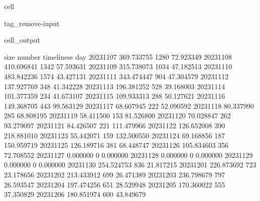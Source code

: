 \documentclass[letterpaper,10pt,english]{jupyterBook}
\begin{document}
\begin{sphinxuseclass}{cell}
\begin{sphinxuseclass}{tag_remove-input}\begin{sphinxVerbatimOutput}

\begin{sphinxuseclass}{cell_output}
\begin{sphinxVerbatim}[commandchars=\\\{\}]
                  size  number  timeliness
day                                       
2023\PYGZhy{}11\PYGZhy{}07  369.733755    1280   72.923349
2023\PYGZhy{}11\PYGZhy{}08  410.696841    1342   57.593631
2023\PYGZhy{}11\PYGZhy{}09  315.738073    1034   47.182513
2023\PYGZhy{}11\PYGZhy{}10  483.842236    1574   43.427131
2023\PYGZhy{}11\PYGZhy{}11  343.474447     904   47.304579
2023\PYGZhy{}11\PYGZhy{}12  137.927769     348   41.342228
2023\PYGZhy{}11\PYGZhy{}13  196.381252     528   39.168003
2023\PYGZhy{}11\PYGZhy{}14  101.377359     234   41.673107
2023\PYGZhy{}11\PYGZhy{}15  109.933313     288   50.127621
2023\PYGZhy{}11\PYGZhy{}16  149.368705     443   99.563129
2023\PYGZhy{}11\PYGZhy{}17   68.607945     222   52.090592
2023\PYGZhy{}11\PYGZhy{}18   80.337990     285   68.808195
2023\PYGZhy{}11\PYGZhy{}19   58.411500     153   81.526800
2023\PYGZhy{}11\PYGZhy{}20   70.028847     262   93.279097
2023\PYGZhy{}11\PYGZhy{}21   84.426507     221  111.479966
2023\PYGZhy{}11\PYGZhy{}22  126.652008     390  218.881010
2023\PYGZhy{}11\PYGZhy{}23   55.442071     159  132.500550
2023\PYGZhy{}11\PYGZhy{}24   69.168856     187  150.959719
2023\PYGZhy{}11\PYGZhy{}25  126.189716     381   68.448747
2023\PYGZhy{}11\PYGZhy{}26  105.834603     356   72.708552
2023\PYGZhy{}11\PYGZhy{}27    0.000000       0    0.000000
2023\PYGZhy{}11\PYGZhy{}28    0.000000       0    0.000000
2023\PYGZhy{}11\PYGZhy{}29    0.000000       0    0.000000
2023\PYGZhy{}11\PYGZhy{}30  254.524753     836   21.817215
2023\PYGZhy{}12\PYGZhy{}01  226.873692     723   23.178656
2023\PYGZhy{}12\PYGZhy{}02  213.433912     699   26.471389
2023\PYGZhy{}12\PYGZhy{}03  236.798679     797   26.593547
2023\PYGZhy{}12\PYGZhy{}04  197.474256     651   28.529948
2023\PYGZhy{}12\PYGZhy{}05  170.360022     555   37.350829
2023\PYGZhy{}12\PYGZhy{}06  180.851974     600   43.849679
\end{sphinxVerbatim}

\end{sphinxuseclass}\end{sphinxVerbatimOutput}

\end{sphinxuseclass}
\end{sphinxuseclass}
\sphinxstepscope
\end{document}
